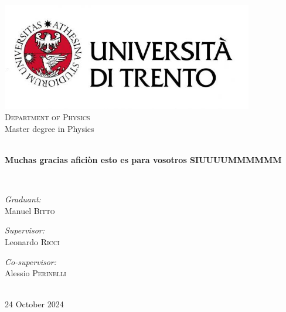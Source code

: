 \begin{titlepage}
    \begin{center}
    
    \includegraphics[width=11cm]{images/Logo Unitn.jpg}\\[1cm]
    
    \textsc{\Large Department of Physics}\\[1.5cm]
    
    {\Large Master degree in Physics}\\[1.5cm]
    
    \hrulefill \\[0.4cm]
    {\huge \bfseries Muchas gracias aficiòn esto es para vosotros SIUUUUMMMMMM\par}\vspace{0.4cm}
    \hrulefill \\[1.5cm]
    
    \begin{minipage}[t]{0.4\textwidth}
    \begin{flushleft} \large
    \emph{Graduant:}\\
    {Manuel \textsc{Bitto}}
    \end{flushleft}
    \end{minipage}
    \begin{minipage}[t]{0.4\textwidth}
    \begin{flushright} \large
    \emph{Supervisor:} \\
    {Leonardo \textsc{Ricci}}
    \end{flushright}
    \begin{flushright}
    \emph{Co-supervisor:}\\
    {Alessio \textsc{Perinelli}}
    \end{flushright}
    \end{minipage}\\[3cm]
    
    \vfill
    {\Large 24 October 2024}
    
    \end{center}
    \end{titlepage}